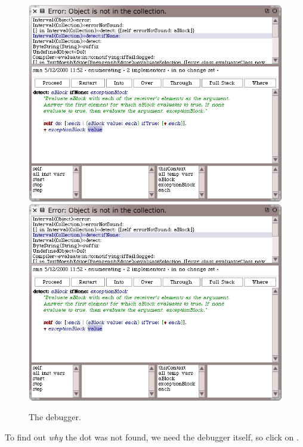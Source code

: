 \documentclass[a4paper,10pt,twoside]{book}
\begin{document}
\begin{figure}[btp]
	\begin{center}
	\ifluluelse
		{\includegraphics[width=\textwidth]{debuggerDetectIfNone}}
		{\includegraphics[scale=0.7]{debuggerDetectIfNone}}
	\end{center}
	\caption{The debugger.}
	\label{fig:debuggerDetectIfNone}
\end{figure}

To find out \emph{why} the dot was not found, we need the debugger itself, so click on .

\end{document}
